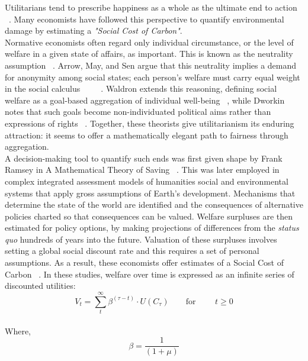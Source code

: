 Utilitarians tend to prescribe happiness as a whole as the ultimate end to action ~\cite{hs1}.
Many economists have followed this perspective to quantify environmental damage by estimating a \emph{"Social Cost of Carbon"}.\\

Normative economists often regard only individual circumstance, or the level of welfare in a given state of affairs, as important.
This is known as the neutrality assumption ~\cite{pd2}.
Arrow, May, and Sen argue that this neutrality implies a demand for anonymity among social states; each person’s welfare must carry equal weight in the social calculus ~\cite{ka1} ~\cite{km1} ~\cite{as2}.
Waldron extends this reasoning, defining social welfare as a goal-based aggregation of individual well-being ~\cite{jw2}, while Dworkin notes that such goals become non-individuated political aims rather than expressions of rights ~\cite{rd1}.
Together, these theorists give utilitarianism its enduring attraction: it seems to offer a mathematically elegant path to fairness through aggregation.\\

A decision-making tool to quantify such ends was first given shape by Frank Ramsey in A Mathematical Theory of Saving ~\cite{fr1}.
This was later employed in complex integrated assessment models of humanities social and environmental systems that apply gross assumptions of Earth's development.
Mechanisms that determine the state of the world are identified and the consequences of alternative policies charted so that consequences can be valued.
Welfare surpluses are then estimated for policy options, by making projections of differences from the \emph{status quo} hundreds of years into the future.
Valuation of these surpluses involves setting a global social discount rate and this requires a set of personal assumptions.
As a result, these economists offer estimates of a Social Cost of Carbon ~\cite{pd2}.
In these studies, welfare over time is expressed as an infinite series of discounted utilities:\\

\begin{equation}
V_t = \sum_t^\infty \beta^{(\tau - t)} \cdot U (C_\tau)
\qquad \text{for }
\qquad t \geq 0
\end{equation}\\

Where,
\begin{equation}
\beta = \frac{1}{(1+\mu)}
\end{equation}\\

